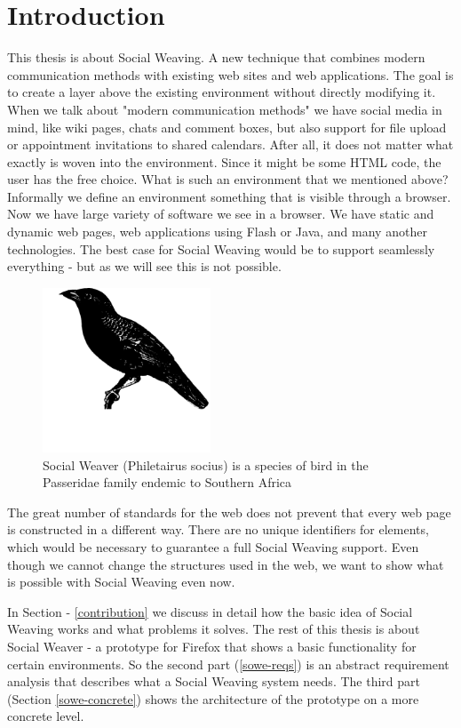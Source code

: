 \section{Introduction}

This thesis is about Social Weaving. A new technique that combines modern communication methods with existing web sites and web applications. The goal is to create a layer above the existing environment without directly modifying it. When we talk about "modern communication methods" we have social media in mind, like wiki pages, chats and comment boxes, but also support for file upload or appointment invitations to shared calendars. After all, it does not matter what exactly is woven into the environment. Since it might be some HTML code, the user has the free choice. What is such an environment that we mentioned above? Informally we define an environment something that is visible through a browser. Now we have large variety of software we see in a browser. We have static and dynamic web pages, web applications using Flash or Java, and many another technologies. The best case for Social Weaving would be to support seamlessly everything - but as we will see this is not possible.

\begin{figure}[!h]\centering
		\includegraphics[width=5cm]{images/socialweaver.png}
		\caption{Social Weaver (Philetairus socius) is a species of bird in the Passeridae family endemic to Southern Africa}
		\label{socialweaver}
\end{figure} 

The great number of standards for the web does not prevent that every web page is constructed in a different way. There are no unique identifiers for elements, which would be necessary to guarantee a full Social Weaving support. Even though we cannot change the structures used in the web, we want to show what is possible with Social Weaving even now. 

In Section  - \ref{contribution} we discuss in detail how the basic idea of Social Weaving works and what problems it solves. The rest of this thesis is about Social Weaver - a prototype for Firefox that shows a basic functionality for certain environments. So the second part (\ref{sowe-reqs}) is an abstract requirement analysis that describes what a Social Weaving system needs. The third part (Section \ref{sowe-concrete}) shows the architecture of the prototype on a more concrete level.

